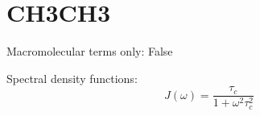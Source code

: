 \documentclass[showkeys,aps,prb,prepreint,amssymb, amsmath,nobibnotes]{revtex4}
\begin{document}
\section{CH3CH3}
Macromolecular terms only:  False

Spectral density functions: $$J\left(\omega\right)=\frac{\tau_c}{1+\omega^2\tau_c^2}  $$    
\end{document}
